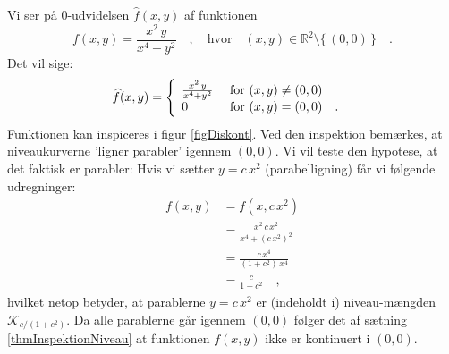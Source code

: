 \begin{example}\label{exampDiskont}
Vi ser på $0$-udvidelsen $\widehat{f}(x,y)$ af funktionen
\begin{equation}
f(x,y) = \frac{x^{2}\,y}{x^{4} + y^{2}} \quad , \quad \textrm{hvor} \quad (x,y) \in \mathbb{R}^{2} \setminus \{\,(0,0) \,\} \quad.
\end{equation}
Det vil sige:
\begin{equation}
\widehat{f}(x,y) = \left\{
           \begin{array}{ll}
             \frac{x^{2}\,y}{x^{4} + y^{2}} & \hbox{\,\,for $(x,y) \neq (0,0)$} \\
             0 & \hbox{\,\,for $(x,y)= (0,0) $\quad . }
           \end{array}
         \right.
\end{equation}
Funktionen kan inspiceres i figur \ref{figDiskont}. Ved den inspektion bemærkes, at niveaukurverne 'ligner parabler' igennem $(0,0)$.
Vi vil teste den hypotese, at det faktisk er parabler: Hvis vi sætter $y = c\,x^{2}$ (parabelligning) får vi følgende udregninger:
\begin{equation}
\begin{aligned}
f(x,y) &= f(x, c\,x^{2})  \\
&= \frac{x^{2}\,c\,x^{2}}{x^{4} + (c\,x^{2})^{2}} \\
&= \frac{c\,x^{4}}{(1 + c^{2})\,x^{4} } \\
&= \frac{c}{1 + c^{2}} \quad,
\end{aligned}
\end{equation}
hvilket netop betyder, at parablerne $y = c\,x^{2}$ er (indeholdt i) niveau-mængden $\mathcal{K}_{c/(1 + c^{2})}$. Da alle parablerne går igennem $(0,0)$ følger det af sætning \ref{thmInspektionNiveau} at funktionen $f(x,y)$ ikke er kontinuert i $(0,0)$.

\end{example}

